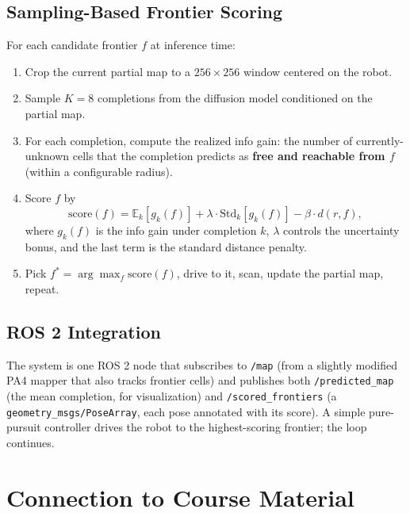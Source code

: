 \documentclass[11pt]{article}
\begin{document}
\subsection{Sampling-Based Frontier Scoring}

For each candidate frontier $f$ at inference time:
\begin{enumerate}[itemsep=0pt,topsep=0pt]
  \item Crop the current partial map to a $256\times256$ window centered on the robot.
  \item Sample $K = 8$ completions from the diffusion model conditioned on the partial map.
  \item For each completion, compute the realized info gain: the number of currently-unknown cells that the completion predicts as \textbf{free and reachable from $f$} (within a configurable radius).
  \item Score $f$ by
  \[
  \text{score}(f) = \mathbb{E}_k[g_k(f)] + \lambda \cdot \text{Std}_k[g_k(f)] - \beta \cdot d(r, f),
  \]
  where $g_k(f)$ is the info gain under completion $k$, $\lambda$ controls the uncertainty bonus, and the last term is the standard distance penalty.
  \item Pick $f^* = \arg\max_f \text{score}(f)$, drive to it, scan, update the partial map, repeat.
\end{enumerate}

\subsection{ROS 2 Integration}

The system is one ROS 2 node that subscribes to \texttt{/map} (from a slightly modified PA4 mapper that also tracks frontier cells) and publishes both \texttt{/predicted\_map} (the mean completion, for visualization) and \texttt{/scored\_frontiers} (a \texttt{geometry\_msgs/PoseArray}, each pose annotated with its score). A simple pure-pursuit controller drives the robot to the highest-scoring frontier; the loop continues.

\section{Connection to Course Material}
\end{document}

